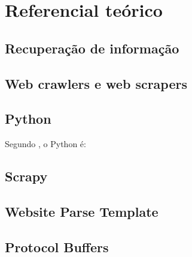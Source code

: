 
\chapter{Referencial teórico}

\section{Recuperação de informação}

\section{Web crawlers e web scrapers}

\section{Python}

Segundo \cite{pythondoc}, o Python é:


\section{Scrapy}
\section{Website Parse Template}

\section{Protocol Buffers}
